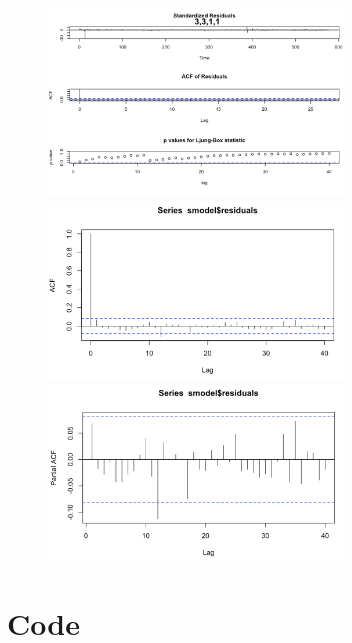 \documentclass[a4paper,11pt]{article}
\begin{document}
    \newpage
    \begin{figure}[H]
        \centering
        \includegraphics[width=0.7\textwidth]{figure-markdown_strict/3-3-1-*.png}
        \includegraphics[width=0.7\textwidth]{figure-markdown_strict/3-3-1-1.1.png}
        \includegraphics[width=0.7\textwidth]{figure-markdown_strict/3-3-1-1.2.png}
        \label{fig:f10}
    \end{figure}

    
    

    \newpage
    \appendix
    \section{Code}
    
\end{document}
